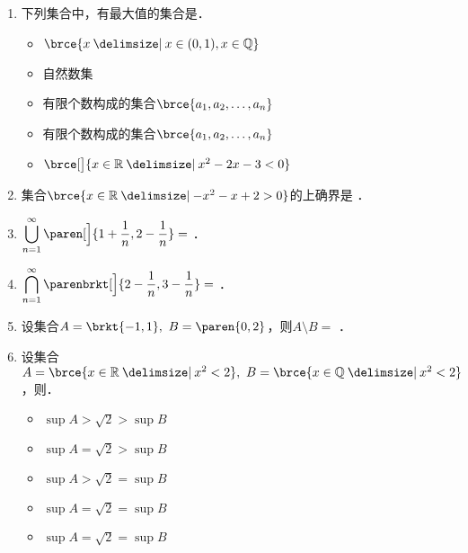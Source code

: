 \begin{enumerate}
\item 下列集合中，有最大值的集合是\uline{\makebox[4em]{}}．
  \begin{itemize}
    \renewcommand{\labelitemi}{\faCircleThin}
  \item \(\brce{x \mid x \in (0, 1), x \in \Q}\)
  \item 自然数集
    \ifshowsol
  \item[\faCircle] 有限个数构成的集合\(\brce{a_1, a_2, \dots, a_n}\)
    \else
  \item 有限个数构成的集合\(\brce{a_1, a_2, \dots, a_n}\)
    \fi
  \item \(\brce[\big]{x \in \R \mid x^2 - 2x -3 < 0}\)
  \end{itemize}

\item 集合\(\brce{x \in \R \mid -x^2 - x + 2 > 0}\)的上确界是\ifshowsol
  \uline{}\else\uline{\makebox[4em]{}}\fi．

\item \(\displaystyle \bigcup_{n=1}^\infty \paren[\Big]{1 + \frac1n, 2 - \frac1n} =\)
  \ifshowsol\uline{}\else\uline{\makebox[4em]{}}\fi．

\item \(\displaystyle \bigcap_{n=1}^\infty \parenbrkt[\Big]{2-\frac1n, 3-\frac1n} =\)
  \ifshowsol\uline{}\else\uline{\makebox[4em]{}}\fi．

\item 设集合\(A = \brkt{-1,1},\ B = \paren{0,2}\)，则\(A \setminus B =\)
  \ifshowsol\uline{}\else\uline{\makebox[4em]{}}\fi．

\item 设集合\(A = \brce{x \in \R \mid x^2 < 2},\ B = \brce{x \in \Q \mid x^2 < 2}\)，则\uline{\makebox[4em]{}}．
  \begin{itemize}
    \renewcommand{\labelitemi}{\faCircleThin}
  \item \(\sup A > \sqrt2 > \sup B\)
  \item \(\sup A = \sqrt2 > \sup B\)
  \item \(\sup A > \sqrt2 = \sup B\)
    \ifshowsol
  \item[\faCircle] \(\sup A = \sqrt2 = \sup B\)
    \else
  \item \(\sup A = \sqrt2 = \sup B\)
    \fi
  \end{itemize}


\end{enumerate}
